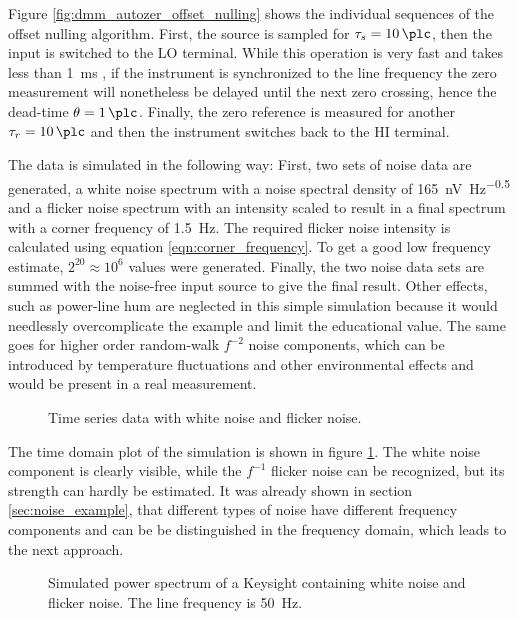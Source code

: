 Figure \ref{fig:dmm_autozer_offset_nulling} shows the individual sequences of the offset nulling algorithm. First, the source is sampled for $\tau_s = \qty{10}{\plc}$, then the input is switched to the LO terminal. While this operation is very fast and takes less than \qty{1}{\ms} \cite{article_3458A_input_impedance}, if the instrument is synchronized to the line frequency the zero measurement will nonetheless be delayed until the next zero crossing, hence the dead-time $\theta = \qty{1}{\plc}$. Finally, the zero reference is measured for another $\tau_r = \qty{10}{\plc}$ and then the instrument switches back to the HI terminal.

The data is simulated in the following way: First, two sets of noise data are generated, a white noise spectrum with a noise spectral density of \qty[power-half-as-sqrt, per-mode=symbol]{165}{\nV \Hz\tothe{-0.5}} and a flicker noise spectrum with an intensity scaled to result in a final spectrum with a corner frequency of \qty{1.5}{\Hz}. The required flicker noise intensity is calculated using equation \ref{eqn:corner_frequency}. To get a good low frequency estimate, $2^{20} \approx 10^{6}$ values were generated. Finally, the two noise data sets are summed with the noise-free input source to give the final result. Other effects, such as power-line hum are neglected in this simple simulation because it would needlessly overcomplicate the example and limit the educational value. The same goes for higher order random-walk $f^{-2}$ noise components, which can be introduced by temperature fluctuations and other environmental effects and would be present in a real measurement.

\begin{figure}[ht]
    \centering
    
    \caption{Time series data with white noise and flicker noise.}
    \label{fig:autozero_raw_time}
\end{figure}

The time domain plot of the simulation is shown in figure \ref{fig:autozero_raw_time}. The white noise component is clearly visible, while the $f^{-1}$ flicker noise can be recognized, but its strength can hardly be estimated. It was already shown in section \ref{sec:noise_example}, that different types of noise have different frequency components and can be be distinguished in the frequency domain, which leads to the next approach.

\begin{figure}[hb]
    \centering
    
    \caption{Simulated power spectrum of a Keysight  containing white noise and flicker noise. The line frequency is \qty{50}{\Hz}.}
    \label{fig:autozero_raw_psd}
\end{figure}

